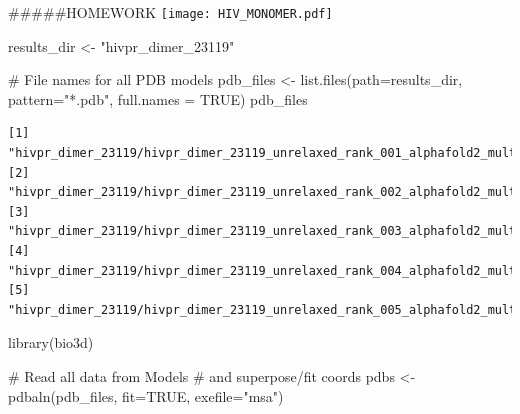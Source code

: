 \documentclass[
  letterpaper,
  DIV=11,
  numbers=noendperiod]{scrartcl}
\newenvironment{Shaded}{\begin{snugshade}}{\end{snugshade}}
\newcommand{\AttributeTok}[1]{\textcolor[rgb]{0.40,0.45,0.13}{#1}}
\newcommand{\CommentTok}[1]{\textcolor[rgb]{0.37,0.37,0.37}{#1}}
\newcommand{\ConstantTok}[1]{\textcolor[rgb]{0.56,0.35,0.01}{#1}}
\newcommand{\FunctionTok}[1]{\textcolor[rgb]{0.28,0.35,0.67}{#1}}
\newcommand{\NormalTok}[1]{\textcolor[rgb]{0.00,0.23,0.31}{#1}}
\newcommand{\OtherTok}[1]{\textcolor[rgb]{0.00,0.23,0.31}{#1}}
\newcommand{\StringTok}[1]{\textcolor[rgb]{0.13,0.47,0.30}{#1}}
\begin{document}
\#\#\#\#\#HOMEWORK \texttt{[image: HIV\_MONOMER.pdf]}

\begin{Shaded}
\begin{Highlighting}[]
\NormalTok{results\_dir }\OtherTok{\textless{}{-}} \StringTok{"hivpr\_dimer\_23119"}
\end{Highlighting}
\end{Shaded}

\begin{Shaded}
\begin{Highlighting}[]
\CommentTok{\# File names for all PDB models}
\NormalTok{pdb\_files }\OtherTok{\textless{}{-}} \FunctionTok{list.files}\NormalTok{(}\AttributeTok{path=}\NormalTok{results\_dir,}
                        \AttributeTok{pattern=}\StringTok{"*.pdb"}\NormalTok{,}
                        \AttributeTok{full.names =} \ConstantTok{TRUE}\NormalTok{)}
\NormalTok{pdb\_files}
\end{Highlighting}
\end{Shaded}

\begin{verbatim}
[1] "hivpr_dimer_23119/hivpr_dimer_23119_unrelaxed_rank_001_alphafold2_multimer_v3_model_1_seed_000.pdb"
[2] "hivpr_dimer_23119/hivpr_dimer_23119_unrelaxed_rank_002_alphafold2_multimer_v3_model_5_seed_000.pdb"
[3] "hivpr_dimer_23119/hivpr_dimer_23119_unrelaxed_rank_003_alphafold2_multimer_v3_model_4_seed_000.pdb"
[4] "hivpr_dimer_23119/hivpr_dimer_23119_unrelaxed_rank_004_alphafold2_multimer_v3_model_2_seed_000.pdb"
[5] "hivpr_dimer_23119/hivpr_dimer_23119_unrelaxed_rank_005_alphafold2_multimer_v3_model_3_seed_000.pdb"
\end{verbatim}

\begin{Shaded}
\begin{Highlighting}[]
\FunctionTok{library}\NormalTok{(bio3d)}

\CommentTok{\# Read all data from Models }
\CommentTok{\#  and superpose/fit coords}
\NormalTok{pdbs }\OtherTok{\textless{}{-}} \FunctionTok{pdbaln}\NormalTok{(pdb\_files, }\AttributeTok{fit=}\ConstantTok{TRUE}\NormalTok{, }\AttributeTok{exefile=}\StringTok{"msa"}\NormalTok{)}
\end{Highlighting}
\end{Shaded}
\end{document}
